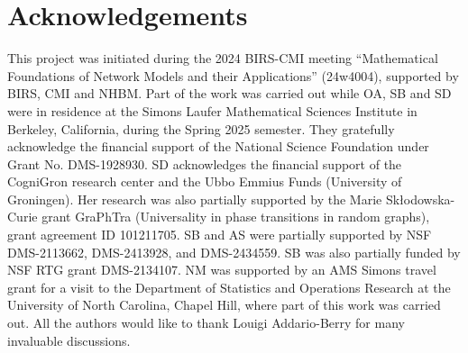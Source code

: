 \documentclass[letterpaper,11pt,reqno]{amsart}
\theoremstyle{definition}
\begin{document}
\section*{Acknowledgements} 
This project was initiated during the 2024 BIRS-CMI meeting “Mathematical Foundations of Network Models and their Applications” (24w4004), supported by BIRS, CMI and NHBM. Part of the work was carried out while OA, SB and SD were in residence at the Simons Laufer Mathematical Sciences Institute in Berkeley, California, during the Spring 2025 semester. They gratefully acknowledge the financial support of the National Science Foundation under Grant No. DMS-1928930. SD acknowledges the financial support of the CogniGron research center and the Ubbo Emmius Funds (University of Groningen). Her research was also partially supported by the Marie Skłodowska-Curie grant GraPhTra (Universality in phase transitions in random graphs), grant agreement ID 101211705. SB and AS were partially supported by NSF DMS-2113662, DMS-2413928, and DMS-2434559.  SB was also partially funded by NSF RTG grant DMS-2134107. NM was supported by an AMS Simons travel grant for a visit to the Department of Statistics and Operations Research at the University of North Carolina, Chapel Hill, where part of this work was carried out. All the authors would like to thank Louigi Addario-Berry for many invaluable discussions.





\end{document}
